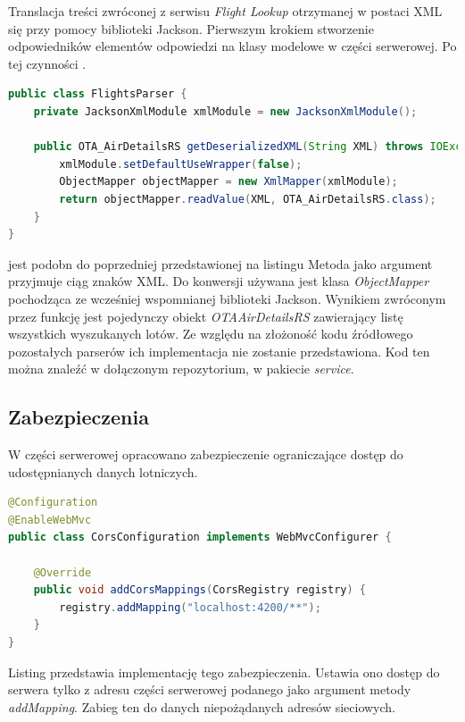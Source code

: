 \documentclass[12pt, twoside]{report}
\begin{document}
Translacja treści zwróconej z serwisu \textit{Flight Lookup} otrzymanej w postaci XML  się przy pomocy biblioteki Jackson. Pierwszym  krokiem  stworzenie odpowiedników elementów odpowiedzi na klasy modelowe w części serwerowej.  Po tej czynności .
\begin{lstlisting}[language=java, caption=Implementacja parsowania treści XML]
public class FlightsParser {
    private JacksonXmlModule xmlModule = new JacksonXmlModule();

    public OTA_AirDetailsRS getDeserializedXML(String XML) throws IOException {
        xmlModule.setDefaultUseWrapper(false);
        ObjectMapper objectMapper = new XmlMapper(xmlModule);
        return objectMapper.readValue(XML, OTA_AirDetailsRS.class);
    }
}
\end{lstlisting}
 jest podobn do poprzedniej przedstawionej na listingu  Metoda  jako argument przyjmuje ciąg znaków XML. Do konwersji używana jest klasa \textit{ObjectMapper} pochodząca ze wcześniej wspomnianej biblioteki Jackson. Wynikiem zwróconym przez funkcję jest pojedynczy obiekt \textit{OTAAirDetailsRS} zawierający  listę wszystkich wyszukanych lotów.
Ze względu na złożoność kodu źródłowego pozostałych parserów ich implementacja nie zostanie przedstawiona. Kod ten można znaleźć w dołączonym repozytorium, w pakiecie \textit{service}.

\subsection{Zabezpieczenia}
 W części serwerowej opracowano zabezpieczenie ograniczające dostęp do udostępnianych danych lotniczych.
\begin{lstlisting}[language=java, caption=Implementacja zabezpieczanie dostępu do serwera]
@Configuration
@EnableWebMvc
public class CorsConfiguration implements WebMvcConfigurer {

    @Override
    public void addCorsMappings(CorsRegistry registry) {
        registry.addMapping("localhost:4200/**");
    }
}
\end{lstlisting}
Listing  przedstawia implementację tego zabezpieczenia. Ustawia ono dostęp do serwera tylko z adresu części serwerowej podanego jako argument metody \textit{addMapping}. Zabieg ten  do danych niepożądanych adresów sieciowych. 
\end{document}
